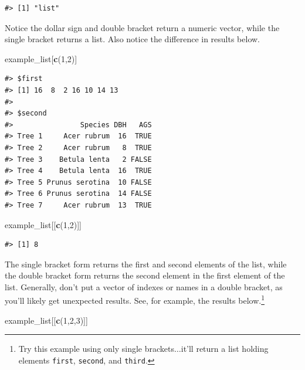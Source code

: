 \documentclass[
  11pt,
]{krantz}
\newenvironment{Shaded}{\begin{snugshade}}{\end{snugshade}}
\newcommand{\DecValTok}[1]{\textcolor[rgb]{0.00,0.00,0.81}{#1}}
\newcommand{\KeywordTok}[1]{\textcolor[rgb]{0.13,0.29,0.53}{\textbf{#1}}}
\newcommand{\NormalTok}[1]{#1}
\theoremstyle{definition}
\theoremstyle{definition}
\theoremstyle{definition}
\theoremstyle{definition}
\theoremstyle{remark}
\begin{document}
\begin{verbatim}
#> [1] "list"
\end{verbatim}

Notice the dollar sign and double bracket return a numeric vector, while the single bracket returns a list. Also notice the difference in results below.

\begin{Shaded}
\begin{Highlighting}[]
\NormalTok{example\_list[}\KeywordTok{c}\NormalTok{(}\DecValTok{1}\NormalTok{,}\DecValTok{2}\NormalTok{)]}
\end{Highlighting}
\end{Shaded}

\begin{verbatim}
#> $first
#> [1] 16  8  2 16 10 14 13
#> 
#> $second
#>                Species DBH   AGS
#> Tree 1     Acer rubrum  16  TRUE
#> Tree 2     Acer rubrum   8  TRUE
#> Tree 3    Betula lenta   2 FALSE
#> Tree 4    Betula lenta  16  TRUE
#> Tree 5 Prunus serotina  10 FALSE
#> Tree 6 Prunus serotina  14 FALSE
#> Tree 7     Acer rubrum  13  TRUE
\end{verbatim}

\begin{Shaded}
\begin{Highlighting}[]
\NormalTok{example\_list[[}\KeywordTok{c}\NormalTok{(}\DecValTok{1}\NormalTok{,}\DecValTok{2}\NormalTok{)]]}
\end{Highlighting}
\end{Shaded}

\begin{verbatim}
#> [1] 8
\end{verbatim}

The single bracket form returns the first and second elements of the list, while the double bracket form returns the second element in the first element of the list. Generally, don't put a vector of indexes or names in a double bracket, as you'll likely get unexpected results. See, for example, the results below.\footnote{Try this example using only single brackets\(\ldots\)it'll return a list holding elements \texttt{first}, \texttt{second}, and \texttt{third}.}

\begin{Shaded}
\begin{Highlighting}[]
\NormalTok{example\_list[[}\KeywordTok{c}\NormalTok{(}\DecValTok{1}\NormalTok{,}\DecValTok{2}\NormalTok{,}\DecValTok{3}\NormalTok{)]]}
\end{Highlighting}
\end{Shaded}
\end{document}
